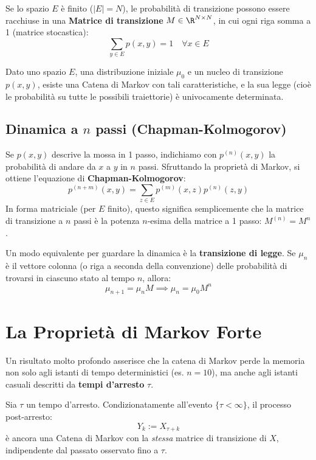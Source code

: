 Se lo spazio $E$ è finito ($|E| = N$), le probabilità di transizione possono essere racchiuse in una \textbf{Matrice di transizione} $M \in \R^{N \times N}$, in cui ogni riga somma a 1 (matrice stocastica):
\[ \sum_{y \in E} p(x, y) = 1 \quad \forall x \in E \]

\begin{theorem}
Dato uno spazio $E$, una distribuzione iniziale $\mu_0$ e un nucleo di transizione $p(x, y)$, esiste una Catena di Markov con tali caratteristiche, e la sua legge (cioè le probabilità su tutte le possibili traiettorie) è univocamente determinata.
\end{theorem}

\subsection{Dinamica a $n$ passi (Chapman-Kolmogorov)}

Se $p(x,y)$ descrive la mossa in 1 passo, indichiamo con $p^{(n)}(x,y)$ la probabilità di andare da $x$ a $y$ in $n$ passi. Sfruttando la proprietà di Markov, si ottiene l'equazione di \textbf{Chapman-Kolmogorov}:
\[ p^{(n+m)}(x, y) = \sum_{z \in E} p^{(m)}(x, z) p^{(n)}(z, y) \]
In forma matriciale (per $E$ finito), questo significa semplicemente che la matrice di transizione a $n$ passi è la potenza $n$-esima della matrice a 1 passo: $M^{(n)} = M^n$.

Un modo equivalente per guardare la dinamica è la \textbf{transizione di legge}. Se $\mu_n$ è il vettore colonna (o riga a seconda della convenzione) delle probabilità di trovarsi in ciascuno stato al tempo $n$, allora:
\[ \mu_{n+1} = \mu_n M \implies \mu_n = \mu_0 M^n \]

\section{La Proprietà di Markov Forte}

Un risultato molto profondo asserisce che la catena di Markov perde la memoria non solo agli istanti di tempo deterministici (es. $n=10$), ma anche agli istanti casuali descritti da \textbf{tempi d'arresto} $\tau$.

\begin{theorem}
Sia $\tau$ un tempo d'arresto. Condizionatamente all'evento $\{\tau < \infty\}$, il processo post-arresto:
\[ Y_k := X_{\tau + k} \]
è ancora una Catena di Markov con la \emph{stessa} matrice di transizione di $X$, indipendente dal passato osservato fino a $\tau$.
\end{theorem}

